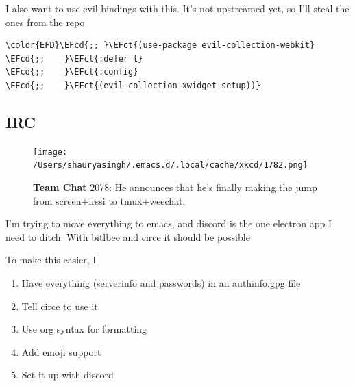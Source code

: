 \documentclass{scrartcl}
\newcommand{\EFct}[1]{\textcolor{EFct}{#1}} %
\newcommand{\EFcd}[1]{\textcolor{EFcd}{#1}} %
\begin{document}
I also want to use evil bindings with this. It's not upstreamed yet, so I'll steal the ones from the repo
\begin{Code}
\begin{Verbatim}[]
\color{EFD}\EFcd{;; }\EFct{(use-package evil-collection-webkit}
\EFcd{;;    }\EFct{:defer t}
\EFcd{;;    }\EFct{:config}
\EFcd{;;    }\EFct{(evil-collection-xwidget-setup))}
\end{Verbatim}
\end{Code}

\subsection{IRC}
\label{sec:org9a8769c}
\begin{figure}[!htb]
	  \centering
	  \texttt{[image: /Users/shauryasingh/.emacs.d/.local/cache/xkcd/1782.png]}
  \caption*{\label{xkcd:1782} \textbf{Team Chat} 2078: He announces that he's finally making the jump from screen+irssi to tmux+weechat.}
	\end{figure}

I'm trying to move everything to emacs, and discord is the one electron app I
need to ditch. With bitlbee and circe it should be possible

To make this easier, I

\begin{enumerate}
\item Have everything (serverinfo and passwords) in an authinfo.gpg file
\item Tell circe to use it
\item Use org syntax for formatting
\item Add emoji support
\item Set it up with discord
\end{enumerate}
\end{document}
